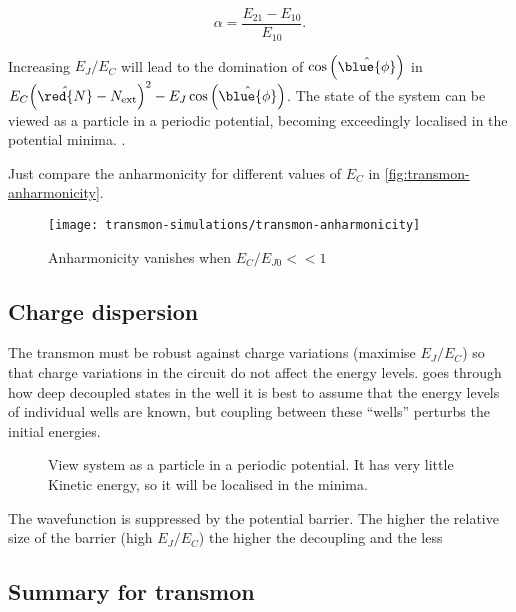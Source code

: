 \begin{equation}\label{eq:transmon-assymetry}
  \alpha = \frac{E_{21} - E_{10}}{E_{10}}.
\end{equation}

\noindent   Increasing   $E_J/E_C$   will   lead   to  the   domination   of   $\cos\left(\hat{\blue{\phi}}\right)$   in
$E_C{\left(\hat{\red{N}}-N_\text{ext}\right)^2}- E_J\cos\left(\hat{\blue{\phi}}\right)$.  The state of the system can be
viewed as  a particle  in a periodic  potential, becoming  exceedingly localised in  the potential  minima.  .

\noindent Just compare the anharmonicity for different values of $E_C$ in \autoref{fig:transmon-anharmonicity}.

\begin{figure}[h]
  \centering \texttt{[image: transmon-simulations/transmon-anharmonicity]}
  \caption{\small Anharmonicity vanishes when $E_{C}/E_{J0} << 1$\label{fig:transmon-anharmonicity}}
\end{figure}

\subsection{Charge dispersion}
\label{sec:charge-dispersion}

The transmon must be robust  against charge variations (maximise $E_J/E_C$) so that charge  variations in the circuit do
not affect the energy levels.    goes through how deep decoupled states in the  well it is best to
assume that the energy levels  of individual wells are known, but coupling between  these ``wells'' perturbs the initial
energies.

\begin{figure}[h]
  \centering {}
  \caption{\small View system as a  particle in a periodic potential.  It has very little Kinetic  energy, so it will be
    localised in the minima.\label{fig:wavefunction_transmon}}
\end{figure}

The wavefunction is suppressed by  the potential barrier.  The higher the relative size  of the barrier (high $E_J/E_C$)
the higher the decoupling and the less

\subsection{Summary for transmon}
\label{sec:summary-transmon}

